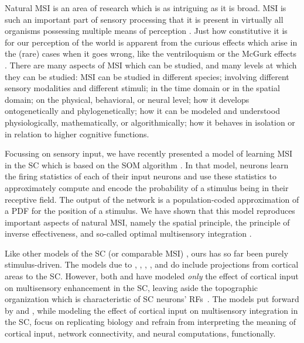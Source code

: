 Natural \ac{MSI} is an area of research which is as intriguing as it is broad.
\ac{MSI} is such an important part of sensory processing that it is present in virtually all organisms possessing multiple means of perception \citep{stein-and-meredith-1993}.
Just how constitutive it is for our perception of the world is apparent from the curious effects which arise in the (rare) cases when it goes wrong, like the ventriloquism or the McGurk effects \citep{chen-and-vroomen-2013,mcgurk-and-macdonald-1976}.
There are many aspects of \ac{MSI} which can be studied, and many levels at which they can be studied:
\ac{MSI} can be studied in different species; involving different sensory modalities and different stimuli; in the time domain or in the spatial domain; on the physical, behavioral, or neural level; how it develops ontogenetically and phylogenetically; how it can be modeled and understood physiologically, mathematically, or algorithmically; how it behaves in isolation or in relation to higher cognitive functions.

Focussing on sensory input, we have recently presented a model of learning \ac{MSI} in the \ac{SC} which is based on the \ac{SOM} algorithm \citep{bauer-and-wermter-2013,bauer-et-al-2014}.
In that model, neurons learn the firing statistics of each of their input neurons and use these statistics to approximately compute and encode the probability of a stimulus being in their receptive field.
The output of the network is a population-coded approximation of a \ac{PDF} for the position of a stimulus.
We have shown \citep{bauer-and-wermter-2013b,bauer-et-al-2014} that this model reproduces important aspects of natural \ac{MSI}, namely the spatial principle, the principle of inverse effectiveness, and so-called optimal multisensory integration \citep{meredith-and-stein-1986,king-2013,stein-and-stanford-2008,alais-and-burr-2004}.

Like other models of the \ac{SC} (or comparable \ac{MSI}) \citep{ohshiro-et-al-2011,fetsch-et-al-2013,deneve-et-al-2001,beck-et-al-2008,ursino-et-al-2009}, ours has so far been purely stimulus-driven.
The models due to \citet{anastasio-and-patton-2003}, \citet{martin-et-al-2009}, \citet{pavlou-and-casey-2010}, \citet{rowland-et-al-2007}, and \citet{cuppini-et-al-2012} do include projections from cortical areas to the \ac{SC}.
However, both \citet{anastasio-and-patton-2003} and \citet{martin-et-al-2009} have modeled \emph{only} the effect of cortical input on multisensory enhancement in the \ac{SC}, leaving aside the topographic organization which is characteristic of \ac{SC} neurons' \acp{RF}~\citep{sparks-1988,wallace-and-stein-1996,king-2013}.
The models put forward by \citet{rowland-et-al-2007} and \citet{cuppini-et-al-2012}, while modeling the effect of cortical input on multisensory integration in the \ac{SC}, focus on replicating biology and refrain from interpreting the meaning of cortical input, network connectivity, and neural computations, functionally.

